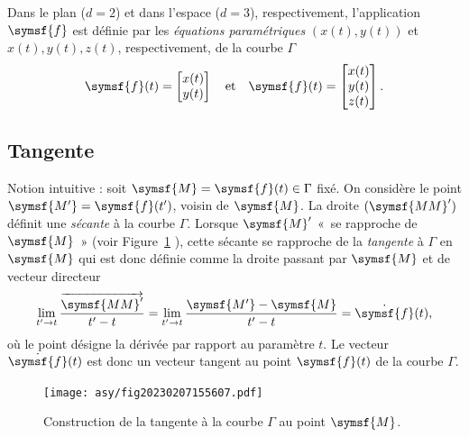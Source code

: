 \documentclass[
  a4paper,
  DIV=11,
  numbers=noendperiod]{scrreprt}
\newcommand{\altvec}[1]{\overrightarrow{#1}}
\newcommand{\point}[1]{\symsf{#1}}
\begin{document}
\begin{tcolorbox}[enhanced jigsaw, toprule=.15mm, breakable, left=2mm, rightrule=.15mm, colbacktitle=quarto-callout-note-color!10!white, colframe=quarto-callout-note-color-frame, title=\textcolor{quarto-callout-note-color}{\faInfo}\hspace{0.5em}{Note}, bottomtitle=1mm, arc=.35mm, coltitle=black, opacityback=0, leftrule=.75mm, titlerule=0mm, toptitle=1mm, bottomrule=.15mm, opacitybacktitle=0.6, colback=white]

Dans le plan (\(d = 2\)) et dans l'espace (\(d = 3\)), respectivement,
l'application \(\point{f}\) est définie par les \emph{équations
paramétriques} \((x(t), y(t))\) et \(x(t), y(t), z(t)\), respectivement,
de la courbe \(\Gamma\) \[
\point{f}(t) = \begin{bmatrix} x(t) \\ y(t) \end{bmatrix}
\quad \text{et} \quad
\point{f}(t) = \begin{bmatrix} x(t) \\ y(t) \\ z(t) \end{bmatrix}.
\]

\end{tcolorbox}

\hypertarget{tangente}{%
\subsection{Tangente}\label{tangente}}

Notion intuitive : soit \(\point{M} = \point{f}(t) \in \Gamma\) fixé. On
considère le point \(\point{M'} = \point{f}(t')\), voisin de
\(\point{M}\). La droite \((\point{MM}')\) définit une \emph{sécante} à
la courbe \(\Gamma\). Lorsque \(\point{M}'\) «~se rapproche de
\(\point{M}\)~» (voir Figure~\ref{fig-20230207155607} ), cette sécante
se rapproche de la \emph{tangente} à \(\Gamma\) en \(\point{M}\) qui est
donc définie comme la droite passant par \(\point{M}\) et de vecteur
directeur \[
\lim_{t' \to t} \frac{\altvec{\point{MM}'}}{t' - t} = \lim_{t' \to t} \frac{\point{M'} - \point{M}}{t' - t} = \dot{\point{f}}(t),
\] où le point désigne la dérivée par rapport au paramètre \(t\). Le
vecteur \(\dot{\point{f}}(t)\) est donc un vecteur tangent au point
\(\point{f}(t)\) de la courbe \(\Gamma\).

\begin{figure}

{\centering \texttt{[image: asy/fig20230207155607.pdf]}

}

\caption{\label{fig-20230207155607}Construction de la tangente à la
courbe \(\Gamma\) au point \(\point{M}\).}

\end{figure}
\end{document}
